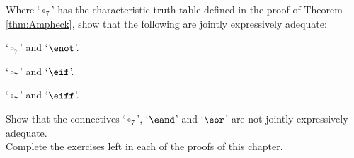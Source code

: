 \practiceproblems

\problempart Where `$\circ_7$' has the characteristic truth table defined in the proof of Theorem \ref{thm:Ampheck}, show that the following are jointly expressively adequate:
	\begin{earg}
		\item `$\circ_7$' and `$\enot$'. %
		\item `$\circ_7$' and `$\eif$'. %
		\item `$\circ_7$' and `$\eiff$'. %
	\end{earg}

\problempart Show that the connectives `$\circ_7$', `$\eand$' and `$\eor$' are not jointly expressively adequate.\\

\problempart Complete the exercises left in each of the proofs of this chapter.